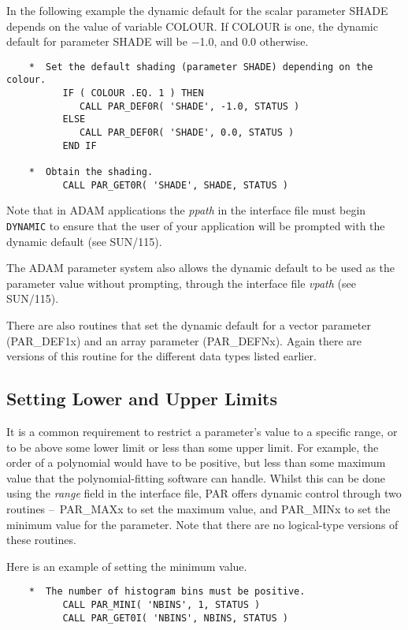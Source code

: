 \documentclass[twoside,11pt]{article}
\newcommand{\xref}[3]{#1}
\newcommand{\xlabel}[1]{}
\newcommand{\dash}{--}
\newcommand{\dash}{-}
\begin{document}
In the following example the dynamic default for the scalar parameter
SHADE depends on the value of variable COLOUR.  If COLOUR is one, the
dynamic default for parameter SHADE will be $-$1.0, and 0.0 otherwise. 

\begin{verbatim}
    *  Set the default shading (parameter SHADE) depending on the colour.
          IF ( COLOUR .EQ. 1 ) THEN
             CALL PAR_DEF0R( 'SHADE', -1.0, STATUS )
          ELSE
             CALL PAR_DEF0R( 'SHADE', 0.0, STATUS )
          END IF

    *  Obtain the shading.
          CALL PAR_GET0R( 'SHADE', SHADE, STATUS )
\end{verbatim}


Note that in {\footnotesize ADAM} applications the {\em ppath\/} in the
interface file must begin {\tt DYNAMIC} to ensure that the user of your
application will be prompted with the dynamic default (see 
\xref{SUN/115}{sun115}{the_ppath_field}).

The {\footnotesize ADAM} parameter system also allows the dynamic 
default to be used as the parameter value without prompting, through 
the interface file {\em vpath\/} (see 
\xref{SUN/115}{sun115}{the_vpath_field}).


There are also routines that set the dynamic default for a vector
parameter (PAR\_DEF1x) and an array parameter (PAR\_DEFNx).   Again
there are versions of this routine for the different data types listed
earlier. 

\subsection{\xlabel{setting_lower_and_upper_limits}Setting Lower and Upper Limits} 

It is a common requirement to restrict a parameter's value to a specific
range, or to be above some lower limit or less than some upper limit. 
For example, the order of a polynomial would have to be positive, but
less than some maximum value that the polynomial-fitting software can
handle.  Whilst this can be done using the {\em range\/} field in the
interface file, PAR offers dynamic control through two
routines \dash\ PAR\_MAXx to set the maximum value, and PAR\_MINx to set the
minimum value for the parameter.  Note that there are no logical-type
versions of these routines. 

Here is an example of setting the minimum value.

\begin{verbatim}
    *  The number of histogram bins must be positive.
          CALL PAR_MINI( 'NBINS', 1, STATUS )
          CALL PAR_GET0I( 'NBINS', NBINS, STATUS )
\end{verbatim}
\end{document}
